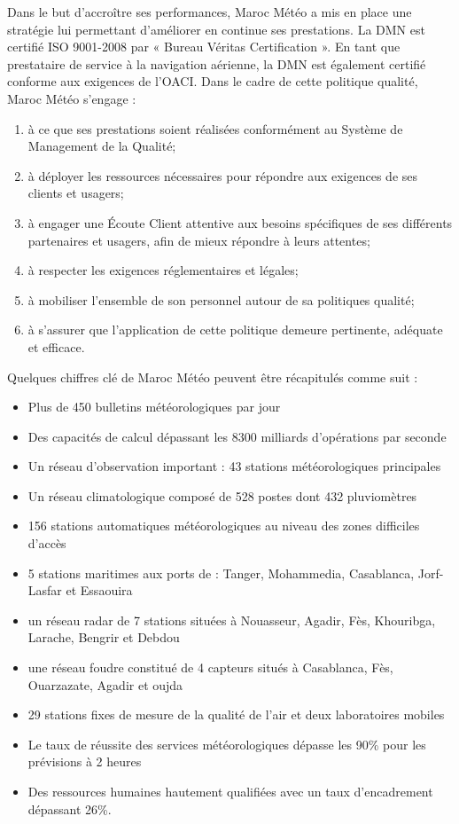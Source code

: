 Dans le but d'accroître ses performances, Maroc Météo a mis en place une stratégie lui permettant d'améliorer en continue ses prestations. La DMN est certifié ISO 9001-2008 par « Bureau Véritas Certification ». En tant que prestataire de service à la navigation aérienne, la DMN est également certifié conforme aux exigences de l’OACI. Dans le cadre de cette politique qualité, Maroc Météo s'engage :
\begin{enumerate}
\item à ce que ses prestations soient réalisées conformément au Système de Management de la Qualité;
\item à déployer les ressources nécessaires pour répondre aux exigences de ses clients et usagers;
\item à engager une Écoute Client attentive aux besoins spécifiques de ses différents partenaires et usagers, afin de mieux répondre à leurs attentes;
\item à respecter les exigences réglementaires et légales;
\item à mobiliser l'ensemble de son personnel autour de sa politiques qualité;
\item à s'assurer que l'application de cette politique demeure pertinente, adéquate et efficace.\\
\end{enumerate}

Quelques chiffres clé de Maroc Météo peuvent être récapitulés comme suit :
\begin{itemize}
\item[\ding{224}] Plus de 450 bulletins météorologiques par jour
\item[\ding{224}] Des capacités de calcul dépassant les 8300 milliards d'opérations par seconde
\item[\ding{224}] Un réseau d'observation important : 43 stations météorologiques principales
\item[\ding{224}] Un réseau climatologique composé de 528 postes dont 432 pluviomètres
\item[\ding{224}] 156 stations automatiques météorologiques au niveau des zones difficiles d'accès
\item[\ding{224}] 5 stations maritimes aux ports de : Tanger, Mohammedia, Casablanca, Jorf-Lasfar et Essaouira
\item[\ding{224}] un réseau radar de 7 stations situées à Nouasseur, Agadir, Fès, Khouribga, Larache, Bengrir et Debdou
\item[\ding{224}] une réseau foudre constitué de 4 capteurs situés à Casablanca, Fès, Ouarzazate, Agadir et oujda
\item[\ding{224}] 29 stations fixes de mesure de la qualité de l'air et deux laboratoires mobiles
\item[\ding{224}] Le taux de réussite des services météorologiques dépasse les 90\% pour les prévisions à 2
 heures
 \item[\ding{224}] Des ressources humaines hautement qualifiées avec un taux d'encadrement dépassant 26\%.\\
\end{itemize}

